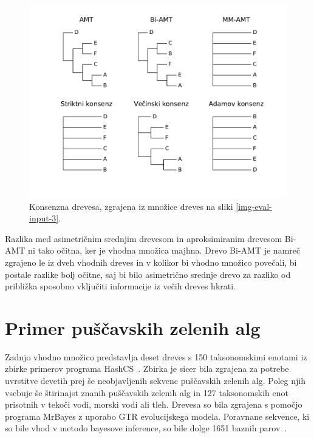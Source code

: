 \documentclass[a4paper, 12pt]{book}
\begin{document}
\begin{figure}
	\begin{center}
		\includegraphics[scale=0.6, clip=true, trim=1.5cm 1.5cm 1cm 0.8cm]{gfx/eval_gfx_3.pdf}
	\end{center}
	\caption{Konsenzna drevesa, zgrajena iz množice dreves na sliki \ref{img-eval-input-3}.}
	\label{img-eval-result-3}
\end{figure}

Razlika med asimetričnim srednjim drevesom in aproksimiranim drevesom Bi-AMT ni tako očitna, ker je vhodna množica majhna. 
Drevo Bi-AMT je namreč zgrajeno le iz dveh vhodnih dreves in v kolikor bi vhodno množico povečali, bi postale razlike bolj
 očitne, saj bi bilo asimetrično srednje drevo za razliko od približka sposobno vključiti informacije iz večih dreves hkrati.

\section{Primer puščavskih zelenih alg}
Zadnjo vhodno množico predstavlja deset dreves s 150 taksonomskimi enotami iz zbirke primerov programa HashCS~\cite{hashcs}. 
Zbirka je sicer bila zgrajena za potrebe uvrstitve devetih prej še neobjavljenih sekvenc puščavskih zelenih alg. Poleg njih 
vsebuje še štirinajst znanih puščavskih zelenih alg in 127 taksonomskih enot prisotnih v tekoči vodi, morski vodi ali tleh. 
Drevesa so bila zgrajena s pomočjo programa MrBayes z uporabo GTR evolucijskega modela. Poravnane sekvence, ki so bile vhod
v metodo bayesove inference, so bile dolge 1651 baznih parov~\cite{taxa150}.
\end{document}
